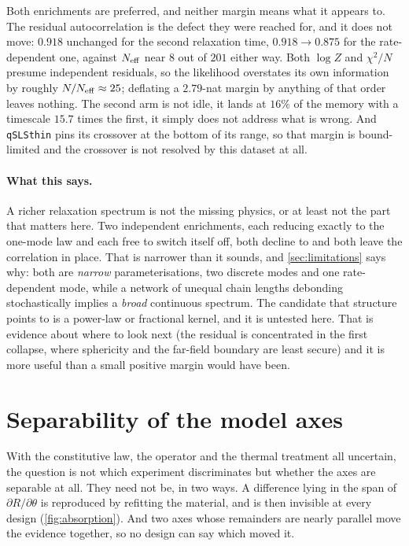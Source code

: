 \documentclass[10pt]{article}
\begin{document}
Both enrichments are preferred, and neither margin means what it appears to. The residual
autocorrelation is the defect they were reached for, and it does not move: $0.918$ unchanged
for the second relaxation time, $0.918 \to 0.875$ for the rate-dependent one, against
$N_{\rm eff}$ near $8$ out of $201$ either way. Both $\log Z$ and $\chi^2/N$ presume
independent residuals, so the likelihood overstates its own information by roughly
$N/N_{\rm eff} \approx 25$; deflating a $2.79$-nat margin by anything of that order leaves
nothing. The second arm is not idle, it lands at $16\%$ of the memory with a timescale
$15.7$ times the first, it simply does not address what is wrong. And \texttt{qSLSthin}
pins its crossover at the bottom of its range, so that margin is bound-limited and the
crossover is not resolved by this dataset at all.

\paragraph{What this says.} A richer relaxation spectrum is not the missing physics, or at
least not the part that matters here. Two independent enrichments, each reducing exactly to
the one-mode law and each free to switch itself off, both decline to and both leave the
correlation in place. That is narrower than it sounds, and \cref{sec:limitations} says why: both
are \emph{narrow} parameterisations, two discrete modes and one rate-dependent mode, while a
network of unequal chain lengths debonding stochastically implies a \emph{broad} continuous
spectrum. The candidate that structure points to is a power-law or fractional kernel, and it is
untested here. That is evidence about where to look next (the residual is
concentrated in the first collapse, where sphericity and the far-field boundary are least
secure) and it is more useful than a small positive margin would have been.

\section{Separability of the model axes}
\label{sec:axes}

With the constitutive law, the operator and the thermal treatment all uncertain, the question
is not which experiment discriminates but whether the axes are separable at all. They need not
be, in two ways. A difference lying in the span of $\partial R/\partial\theta$ is reproduced by
refitting the material, and is then invisible at every design (\cref{fig:absorption}). And two
axes whose remainders are nearly parallel move the evidence together, so no design can say
which moved it.
\end{document}

